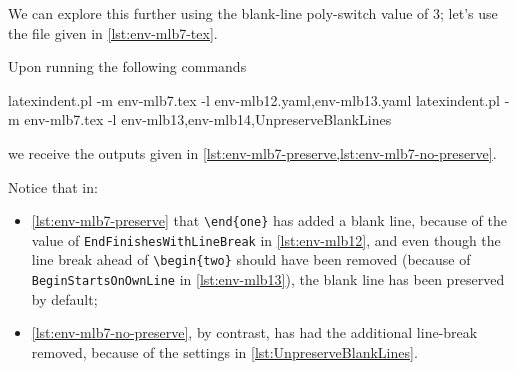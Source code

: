 \begin{example}
  \begin{cmhtcbraster}[ raster left skip=-3.5cm,
    raster right skip=-2cm,
    raster force size=false,
    raster column 1/.style={add to width=-.2\textwidth},
    raster column 2/.style={add to width=.2\textwidth},
    raster column skip=.06\linewidth]
  \end{cmhtcbraster}
  \end{example}

  \begin{example}
  We can explore this further using the blank-line poly-switch value of $3$; let's use
  the file given in \cref{lst:env-mlb7-tex}.


  Upon running the following commands 

  \begin{commandshell}
latexindent.pl -m env-mlb7.tex -l env-mlb12.yaml,env-mlb13.yaml
latexindent.pl -m env-mlb7.tex -l env-mlb13,env-mlb14,UnpreserveBlankLines
\end{commandshell}

  we receive the outputs given in \cref{lst:env-mlb7-preserve,lst:env-mlb7-no-preserve}.


  Notice that in:
  \begin{itemize}
   \item \cref{lst:env-mlb7-preserve} that \lstinline!\end{one}! has added a blank line,
         because of the value of \texttt{EndFinishesWithLineBreak} in \vref{lst:env-mlb12}, and
         even though the line break ahead of \lstinline!\begin{two}! should have been removed
         (because of \texttt{BeginStartsOnOwnLine} in \vref{lst:env-mlb13}), the blank line has
         been preserved by default;
   \item \cref{lst:env-mlb7-no-preserve}, by contrast, has had the additional line-break removed,
         because of the settings in \cref{lst:UnpreserveBlankLines}.
  \end{itemize}
  \end{example}

